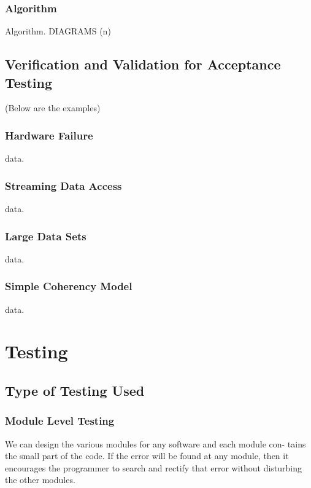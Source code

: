 \documentclass{report} %
\begin{document}
			\subsection{Algorithm}
			Algorithm.
			DIAGRAMS (n)
		
		\section{Verification and Validation for Acceptance Testing}
			
			(Below are the examples)
			
			\subsection{Hardware Failure}
			data.
			
			\subsection{Streaming Data Access}
			data.
			
			\subsection{Large Data Sets}
			data.
			
			\subsection{Simple Coherency Model}
			data.
		

	\chapter{Testing}
	\pagebreak	
		\section{Type of Testing Used}
			\subsection{Module Level Testing}
			We can design the various modules for any software and each module con-
			tains the small part of the code. If the error will be found at any module,
			then it encourages the programmer to search and rectify that error without
			disturbing the other modules.
			
\end{document}
